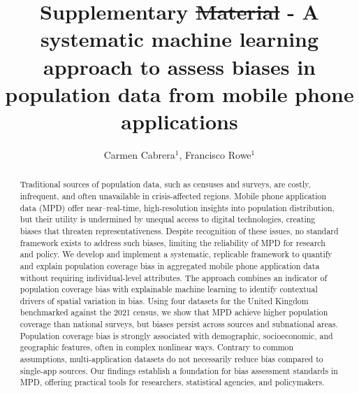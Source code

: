 \documentclass[]{rsos}%
\providecommand{\DIFadd}[1]{{\protect\color{blue}\uwave{#1}}} %
\providecommand{\DIFdel}[1]{{\protect\color{red}\sout{#1}}}                      %
\providecommand{\DIFaddbegin}{} %
\providecommand{\DIFaddend}{} %
\providecommand{\DIFdelbegin}{} %
\providecommand{\DIFdelend}{} %
\begin{document}
\title{Supplementary \DIFdelbegin \DIFdel{Material }\DIFdelend \DIFaddbegin \DIFadd{Information }\DIFaddend - A systematic machine learning approach to assess biases in population data from mobile phone applications}

\author{
Carmen Cabrera$^{1}$,
Francisco Rowe$^{1}$}

\address{
  $^{1}$Geographic Data Science Lab, Department of Geography and Planning, University of Liverpool, Liverpool, United Kingdom.\\
  $^{}$}
\subject{
Mobile phone data,
Human mobility,
Explainable AI,
Spatial analysis}



\begin{abstract}
Traditional sources of population data, such as censuses and surveys, are costly, infrequent, and often unavailable in crisis-affected regions. Mobile phone application data (MPD) offer near--real-time, high-resolution insights into population distribution, but their utility is undermined by unequal access to digital technologies, creating biases that threaten representativeness. Despite recognition of these issues, no standard framework exists to address such biases, limiting the reliability of MPD for research and policy. We develop and implement a systematic, replicable framework to quantify and explain population coverage bias in aggregated mobile phone application data without requiring individual-level attributes. The approach combines an indicator of population coverage bias with explainable machine learning to identify contextual drivers of spatial variation in bias. Using four datasets for the United Kingdom benchmarked against the 2021 census, we show that MPD achieve higher population coverage than national surveys, but biases persist across sources and subnational areas. Population coverage bias is strongly associated with demographic, socioeconomic, and geographic features, often in complex nonlinear ways. Contrary to common assumptions, multi-application datasets do not necessarily reduce bias compared to single-app sources. Our findings establish a foundation for bias assessment standards in MPD, offering practical tools for researchers, statistical agencies, and policymakers.
\end{abstract}
\end{document}
